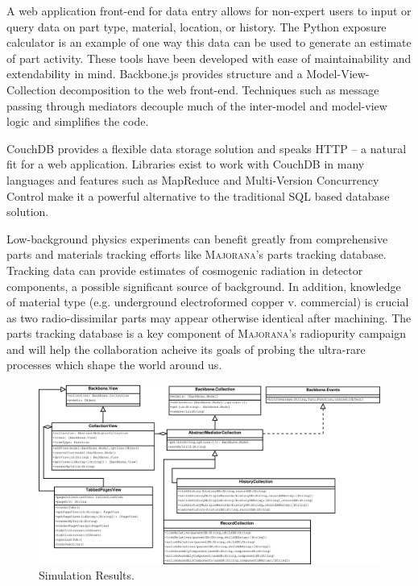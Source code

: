 \documentclass[journal]{IEEEtran}
\begin{document}
A web application front-end for data entry allows for non-expert users to input
or query data on part type, material, location, or history. The Python exposure
calculator is an example of one way this data can be used to generate an estimate
of part activity. These tools have been developed with ease of maintainability and
extendability in mind. Backbone.js provides structure and a Model-View-Collection
decomposition to the web front-end. Techniques such as message passing through mediators
decouple much of the inter-model and model-view logic and simplifies the code.

CouchDB provides a flexible data storage solution and speaks HTTP -- a natural
fit for a web application. Libraries exist to work with CouchDB in many languages and
features such as MapReduce and Multi-Version Concurrency Control make it a powerful
alternative to the traditional SQL based database solution.

Low-background physics experiments can benefit greatly from comprehensive
parts and materials tracking efforts like \textsc{Majorana}'s parts tracking database.
Tracking data can provide estimates of cosmogenic radiation in detector components,
a possible significant source of background. In addition, knowledge of material type
(e.g. underground electroformed copper v. commercial) is crucial as two radio-dissimilar 
parts may appear otherwise identical after machining. The parts tracking database is a 
key component of \textsc{Majorana}'s radiopurity campaign and will help the collaboration acheive
its goals of probing the ultra-rare processes which shape the world around us.

\begin{figure}[!p]
\centering
\includegraphics[width=7.5in]{Singletons}
\caption{Simulation Results.}
\label{singletons}
\end{figure}
\end{document}
